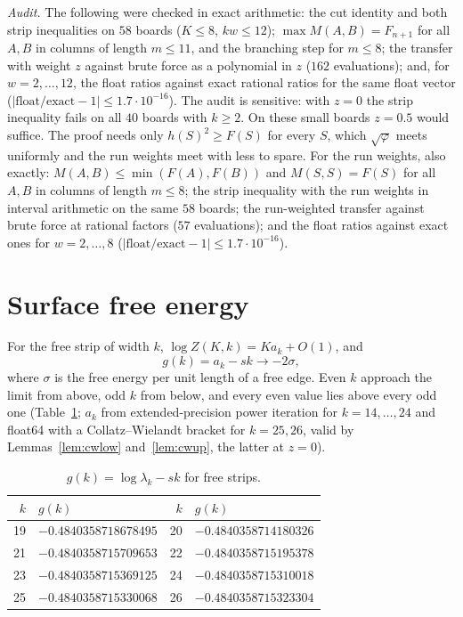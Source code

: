 \documentclass[11pt]{amsart}
\theoremstyle{definition}
\theoremstyle{remark}
\begin{document}
\emph{Audit.} The following were checked in exact arithmetic: the cut identity and both strip
inequalities on $58$ boards ($K \le 8$, $kw \le 12$); $\max M(A, B) = F_{n+1}$ for all $A, B$ in
columns of length $m \le 11$, and the branching step for $m \le 8$; the transfer with weight $z$
against brute force as a polynomial in $z$ ($162$ evaluations); and, for $w = 2, \dots, 12$, the
float ratios against exact rational ratios for the same float vector ($|\text{float}/\text{exact}
- 1| \le 1.7\cdot10^{-16}$). The audit is sensitive: with $z = 0$ the strip inequality fails on all
$40$ boards with $k \ge 2$. On these small boards $z = 0.5$ would suffice. The proof needs only
$h(S)^2 \ge F(S)$ for every $S$, which $\sqrt\varphi$ meets uniformly and the run weights meet with
less to spare. For the run weights, also exactly: $M(A, B) \le
\min(F(A), F(B))$ and $M(S, S) = F(S)$ for all $A, B$ in columns of length $m \le 8$; the strip
inequality with the run weights in interval arithmetic on the same $58$ boards; the run-weighted
transfer against brute force at rational factors ($57$ evaluations); and the float ratios against
exact ones for $w = 2, \dots, 8$ ($|\text{float}/\text{exact} - 1| \le 1.7\cdot10^{-16}$).

\section{Surface free energy}\label{sec:surface}
For the free strip of width $k$, $\log Z(K, k) = K a_k + O(1)$, and
\[
  g(k) = a_k - s k \longrightarrow -2\sigma,
\]
where $\sigma$ is the free energy per unit length of a free edge. Even $k$ approach the limit from
above, odd $k$ from below, and every even value lies above every odd one (Table~\ref{tab:surface};
$a_k$ from extended-precision power iteration for $k = 14, \dots, 24$ and float64 with a
Collatz--Wielandt bracket for $k = 25, 26$, valid by Lemmas~\ref{lem:cwlow} and~\ref{lem:cwup},
the latter at $z = 0$).

\begin{table}[ht]
\caption{$g(k) = \log\lambda_k - sk$ for free strips.}\label{tab:surface}
\begin{tabular}{rlrl}
\toprule
$k$ & $g(k)$ & $k$ & $g(k)$ \\
\midrule
19 & $-0.4840358718678495$ & 20 & $-0.4840358714180326$ \\
21 & $-0.4840358715709653$ & 22 & $-0.4840358715195378$ \\
23 & $-0.4840358715369125$ & 24 & $-0.4840358715310018$ \\
25 & $-0.4840358715330068$ & 26 & $-0.4840358715323304$ \\
\bottomrule
\end{tabular}
\end{table}
\end{document}
